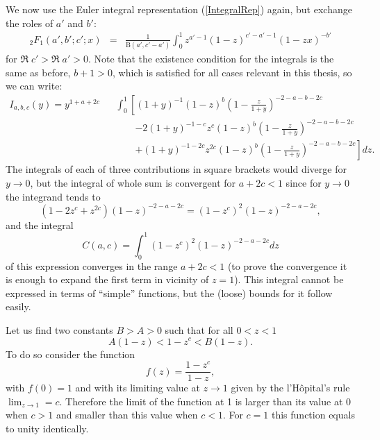 %
We now use the Euler integral representation (\ref{IntegralRep}) again, but exchange the roles of $a'$ and $b'$:
%
\begin{eqnarray*}
_{2}F_{1}(a',b';c';x) &= &\frac{1}{\mathrm{B}(a',c'-a')}  \int_{0}^{1} z^{a'-1} (1-z)^{c'-a'-1} (1-zx)^{-b'} 
\end{eqnarray*}
%
for $\Re \; c' > \Re \;  a' > 0$. Note that the existence condition for the integrals is the same as before, $b+1>0$, which is satisfied for all cases relevant in this thesis, so we can write:
%
\begin{eqnarray*}
I_{a,b,c}(y) = y^{1+a+2c} &&   \int_{0}^{1}  \left[  (1+y)^{-1}  (1-z)^{b} \left( 1- \frac{z}{1+y} \right)^{-2-a-b-2c}  \right. \\ 
&& \qquad \left. -2 (1+y)^{-1-c} z^c (1-z)^{b} \left( 1- \frac{z}{1+y} \right)^{-2-a-b-2c} \right. \\ 
&& \qquad \left. + (1+y)^{-1-2c} z^{2c} (1-z)^{b} \left( 1- \frac{z}{1+y} \right)^{-2-a-b-2c} \right] dz .
\end{eqnarray*}
The integrals of each of three contributions in square brackets would diverge for $y \to 0$, but the integral of whole sum is convergent for $a+2c < 1$ since for $y \to 0$ the integrand tends to 
\[
(1-2 z^{c} + z^{2c}) (1-z)^{-2-a-2c} =  (1-z^c)^2 (1-z)^{-2-a-2c},
\]
and the integral
\[
 C(a,c) = \int_0^1 (1-z^c)^2 (1-z)^{-2-a-2c} dz
\]
of this expression converges in the range $a+2c <1$ (to prove the convergence it is enough to expand the first term in vicinity of $z=1$). 
This integral cannot be expressed in terms of ``simple'' functions, but the (loose) bounds for it follow easily. 

Let us find two constants $B > A > 0$ such that for all $0< z < 1$
\[
 A (1-z) < 1-z^c < B (1-z). 
\]
To do so consider the function
\[
 f(z)=\frac{1-z^c}{1-z},
\]
with $f(0)=1$ and with its limiting value at $z \to 1$ given by the l'H\^opital's rule $\lim_{z \to 1} = c$. 
Therefore the limit of the function at 1 is larger than its value at $0$ when $c>1$ and smaller than this value when $c<1$. For $c=1$ this function equals to unity identically.

